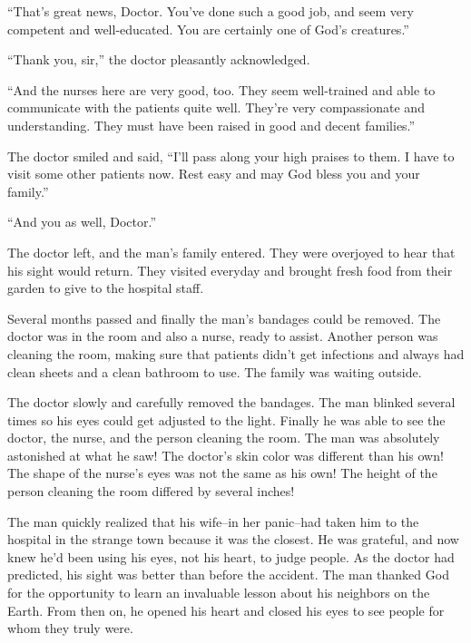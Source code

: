 “That's great news, Doctor. You've done such a good job, and seem very competent and well-educated. You are certainly one of God's creatures.”

“Thank you, sir,” the doctor pleasantly acknowledged.

“And the nurses here are very good, too. They seem well-trained and able to communicate with the patients quite well. They're very compassionate and understanding. They must have been raised in good and decent families.”

The doctor smiled and said, “I'll pass along your high praises to them. I have to visit some other patients now. Rest easy and may God bless you and your family.”

“And you as well, Doctor.”

The doctor left, and the man's family entered. They were overjoyed to hear that his sight would return. They visited everyday and brought fresh food from their garden to give to the hospital staff.

Several months passed and finally the man's bandages could be removed. The doctor was in the room and also a nurse, ready to assist. Another person was cleaning the room, making sure that patients didn't get infections and always had clean sheets and a clean bathroom to use. The family was waiting outside.

The doctor slowly and carefully removed the bandages. The man blinked several times so his eyes could get adjusted to the light. Finally he was able to see the doctor, the nurse, and the person cleaning the room. The man was absolutely astonished at what he saw! The doctor's skin color was different than his own! The shape of the nurse's eyes was not the same as his own! The height of the person cleaning the room differed by several inches!

The man quickly realized that his wife--in her panic--had taken him to the hospital in the strange town because it was the closest. He was grateful, and now knew he'd been using his eyes, not his heart, to judge people. As the doctor had predicted, his sight was better than before the accident. The man thanked God for the opportunity to learn an invaluable lesson about his neighbors on the Earth. From then on, he opened his heart and closed his eyes to see people for whom they truly were.
